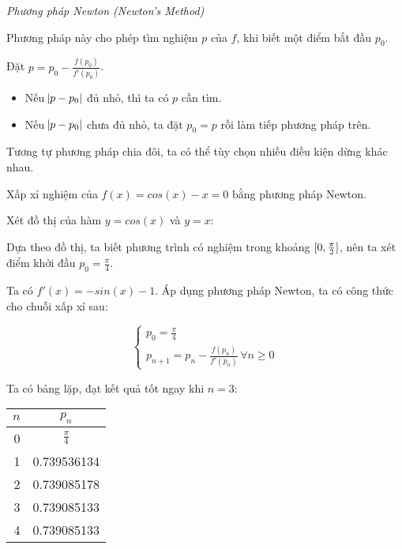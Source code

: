 \documentclass[../../Lectures.tex]{subfiles}
\begin{document}
\begin{method}\label{method:newton}
    \emph{Phương pháp Newton (Newton's Method)}

    Phương pháp này cho phép tìm nghiệm \(p\) của \(f\), khi biết một điểm bắt
    đầu \(p_0\).

    Đặt \(p = p_0 - \frac{f(p_0)}{f'(p_0)}\).

    \begin{itemize}
        \item Nếu \(\abs{p - p_0}\) đủ nhỏ, thì ta có \(p\) cần tìm.
        \item Nếu \(\abs{p - p_0}\) chưa đủ nhỏ, ta đặt \(p_0 = p\) rồi làm tiếp
            phương pháp trên.
    \end{itemize}
\end{method}

Tương tự phương pháp chia đôi, ta có thể tùy chọn nhiều điều kiện dừng khác
nhau.

\begin{exmp}
    Xấp xỉ nghiệm của \(f(x) = cos(x) - x = 0\) bằng phương pháp Newton.

    Xét đồ thị của hàm \(y = cos(x)\) và \(y = x\):


    Dựa theo đồ thị, ta biết phương trình có nghiệm trong khoảng
    \(\interval{0}{\frac{\pi}{2}}\), nên ta xét điểm khởi đầu \(p_0 =
    \frac{\pi}{4}\).

    Ta có \(f'(x) = -sin(x) - 1\). Áp dụng phương pháp Newton, ta có công thức
    cho chuỗi xấp xỉ sau:

    \[\begin{cases}
        p_0 = \frac{\pi}{4} \\
        p_{n + 1} = p_n - \frac{f(p_n)}{f'(p_n)} \, \forall n \geq 0
    \end{cases}\]

    Ta có bảng lặp, đạt kết quả tốt ngay khi \(n = 3\):

    \begin{table}[H]
        \centering
        \begin{tabular}{r S[table-format=1.9]}
            \toprule
            {\(n\)}  &     {\(p_n\)}       \\
              &  \(\frac{\pi}{4}\)  \\
                  1  &  0.739536134        \\
                  2  &  0.739085178        \\
                  3  &  0.739085133        \\
                  4  &  0.739085133        \\
            \bottomrule
        \end{tabular}
    \end{table}

\end{exmp}
\end{document}
